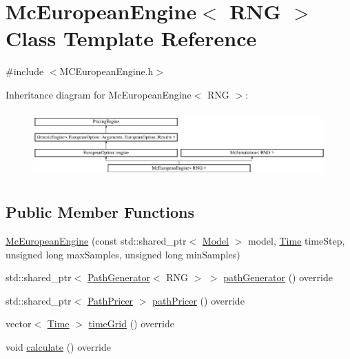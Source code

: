 \hypertarget{class_mc_european_engine}{}\section{Mc\+European\+Engine$<$ R\+NG $>$ Class Template Reference}
\label{class_mc_european_engine}


{\ttfamily \#include $<$M\+C\+European\+Engine.\+h$>$}

Inheritance diagram for Mc\+European\+Engine$<$ R\+NG $>$\+:\begin{figure}[H]
\begin{center}
\leavevmode
\includegraphics[height=2.586605cm]{class_mc_european_engine}
\end{center}
\end{figure}
\subsection*{Public Member Functions}
\begin{DoxyCompactItemize}
\item 
\hyperlink{class_mc_european_engine_a22424812ecaf6e04134eeaa45b9d1e1f}{Mc\+European\+Engine} (const std\+::shared\+\_\+ptr$<$ \hyperlink{class_model}{Model} $>$ model, \hyperlink{_name_def_8h_ac2d3e0ba793497bcca555c7c2cf64ff3}{Time} time\+Step, unsigned long max\+Samples, unsigned long min\+Samples)
\item 
std\+::shared\+\_\+ptr$<$ \hyperlink{class_path_generator}{Path\+Generator}$<$ R\+NG $>$ $>$ \hyperlink{class_mc_european_engine_af3bd77fe30b60833448ee44efe6280d9}{path\+Generator} () override
\item 
std\+::shared\+\_\+ptr$<$ \hyperlink{class_path_pricer}{Path\+Pricer} $>$ \hyperlink{class_mc_european_engine_aa504b56142c757d49cc4c9e079682f6d}{path\+Pricer} () override
\item 
vector$<$ \hyperlink{_name_def_8h_ac2d3e0ba793497bcca555c7c2cf64ff3}{Time} $>$ \hyperlink{class_mc_european_engine_a0c81d3320dc3567596b41d91444f5f54}{time\+Grid} () override
\item 
void \hyperlink{class_mc_european_engine_a6c29ef7a7ba6cd1a2f93ee63070cf40e}{calculate} () override
\end{DoxyCompactItemize}
